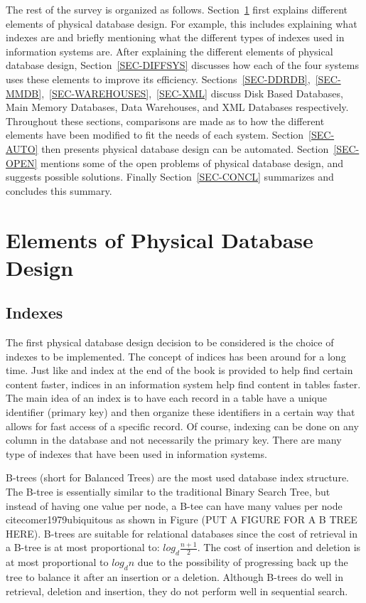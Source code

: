 \documentclass[12pt,a4paper]{article}
\begin{document}
The rest of the survey is organized as follows. Section~\ref{SEC-ELEMENTS} first explains different elements of physical database design. For example, this includes explaining what indexes are and briefly mentioning what the different types of indexes used in information systems are. After explaining the different elements of physical database design, Section~\ref{SEC-DIFFSYS} discusses how each of the four systems uses these elements to improve its efficiency. Sections~\ref{SEC-DDRDB},~\ref{SEC-MMDB},~\ref{SEC-WAREHOUSES},~\ref{SEC-XML} discuss Disk Based Databases, Main Memory Databases, Data Warehouses, and XML Databases respectively. Throughout these sections, comparisons are made as to how the different elements have been modified to fit the needs of each system. Section~\ref{SEC-AUTO} then presents physical database design can be automated. Section~\ref{SEC-OPEN} mentions some of the open problems of physical database design, and suggests possible solutions. Finally Section~\ref{SEC-CONCL} summarizes and concludes this summary.


\section{Elements of Physical Database Design}
\label{SEC-ELEMENTS}

\subsection{Indexes}

The first physical database design decision to be considered is the choice of indexes to be implemented. The concept of indices has been around for a long time. Just like and index at the end of the book is provided to help find certain content faster, indices in an information system help find content in tables faster. The main idea of an index is to have each record in a table have a unique identifier (primary key) and then organize these identifiers in a certain way that allows for fast access of a specific record. Of course, indexing can be done on any column in the database and not necessarily the primary key. There are many type of indexes that have been used in information systems. 

B-trees (short for Balanced Trees) are the most used database index structure.  The B-tree is essentially similar to the traditional Binary Search Tree, but instead of having one value per node, a B-tee can have many values per node~
cite{comer1979ubiquitous} as shown in Figure (PUT A FIGURE FOR A B TREE HERE). B-trees are suitable for relational databases since the cost of retrieval in a B-tree is at most proportional to: $log_{d}\frac{n+1}{2}$. The cost of insertion and deletion is at most proportional to $log_{d}n$ due to the possibility of progressing back up the tree to balance it after an insertion or a deletion. Although B-trees do well in retrieval, deletion and insertion, they do not perform well in sequential search. 
\end{document}
